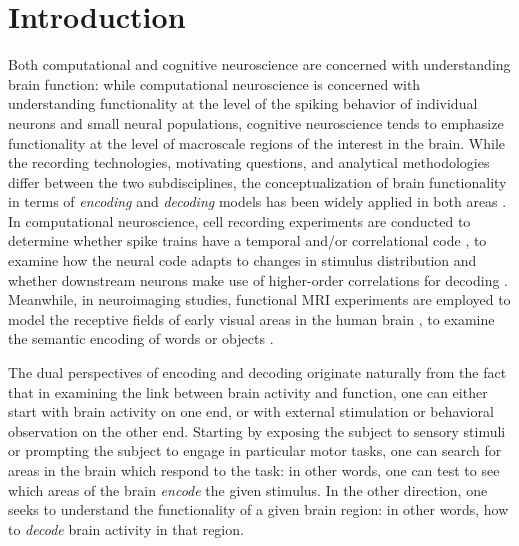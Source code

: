 \documentclass[12pt]{article}
\begin{document}
\section{Introduction}
Both computational and cognitive neuroscience are concerned with
understanding brain function: while computational neuroscience is
concerned with understanding functionality at the level of the spiking
behavior of individual neurons and small neural populations, cognitive
neuroscience tends to emphasize functionality at the level of
macroscale regions of the interest in the brain.  While the recording
technologies, motivating questions, and analytical methodologies
differ between the two subdisciplines, the conceptualization of brain
functionality in terms of \emph{encoding} and \emph{decoding} models
has been widely applied in both
areas \cite{QuianQuiroga2009}\cite{Naselaris2011}.  In computational
neuroscience, cell recording experiments are conducted to determine
whether spike trains have a temporal and/or correlational
code \cite{Nelken2005}\cite{Hatsopoulos1998}, to examine how the
neural code adapts to changes in stimulus
distribution \cite{Fairhall2001} and whether downstream neurons make
use of higher-order correlations for decoding \cite{Oizumi2010}.
Meanwhile, in neuroimaging studies, functional MRI experiments are
employed to model the receptive fields of early visual areas in the
human brain \cite{Kay2008a}, to examine the semantic encoding of words \cite{Mitchell2008}
or objects \cite{Huth2012}.

The dual perspectives of encoding and decoding originate naturally
from the fact that in examining the link between brain activity and
function, one can either start with brain activity on one end, or with
external stimulation or behavioral observation on the other end.
Starting by exposing the subject to sensory stimuli or prompting the
subject to engage in particular motor tasks, one can search for areas
in the brain which respond to the task: in other words, one can test
to see which areas of the brain \emph{encode} the given stimulus.  In
the other direction, one seeks to understand the functionality of a
given brain region: in other words, how to \emph{decode} brain
activity in that region.
\end{document}
